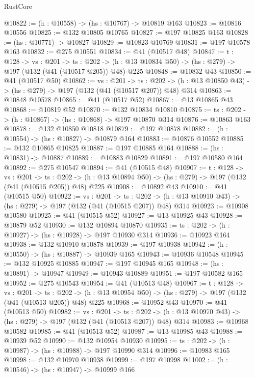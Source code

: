 \begin{lexlean}{RustCore}
\begin{coremodule}
@10822 := (h : @10558) -> (hs : @10767) -> @10819 @163
@10823 := @10816 @10556
@10825 := @132 @10805 @10765
@10827 := @197 @10825 @163
@10828 := (hs : @10771) -> @10827
@10829 := @10823 @10769
@10831 := @197 @10578 @163
@10832 := @275 @10551
@10834 := @41 (@10517 @48)
@10847 := {t : @128} ->
  {vs : @201} ->
  {ts : @202} -> (h : @13 @10834 @50) -> (hs : @279) -> @197 (@132 (@41 (@10517 @205)) @48) @225
@10848 := @10832 @43
@10850 := @41 (@10517 @50)
@10862 := {vs : @201} ->
  {ts : @202} -> (h : @13 @10850 @43) -> (hs : @279) -> @197 (@132 (@41 (@10517 @207)) @48) @314
@10863 := @10848 @10578
@10865 := @41 (@10517 @52)
@10867 := @13 @10865 @43
@10868 := @10819 @52
@10870 := @132 @10834 @10810
@10875 := {ts : @202} -> (h : @10867) -> (hs : @10868) -> @197 @10870 @314
@10876 := @10863 @163
@10878 := @132 @10850 @10818
@10879 := @197 @10878
@10882 := (h : @10554) -> (hs : @10827) -> @10879 @164
@10883 := @10876 @10552
@10885 := @132 @10865 @10825
@10887 := @197 @10885 @164
@10888 := (hs : @10831) -> @10887
@10889 := @10883 @10829
@10891 := @197 @10580 @164
@10892 := @275 @10547
@10894 := @41 (@10515 @48)
@10907 := {t : @128} ->
  {vs : @201} ->
  {ts : @202} -> (h : @13 @10894 @50) -> (hs : @279) -> @197 (@132 (@41 (@10515 @205)) @48) @225
@10908 := @10892 @43
@10910 := @41 (@10515 @50)
@10922 := {vs : @201} ->
  {ts : @202} -> (h : @13 @10910 @43) -> (hs : @279) -> @197 (@132 (@41 (@10515 @207)) @48) @314
@10923 := @10908 @10580
@10925 := @41 (@10515 @52)
@10927 := @13 @10925 @43
@10928 := @10879 @52
@10930 := @132 @10894 @10870
@10935 := {ts : @202} -> (h : @10927) -> (hs : @10928) -> @197 @10930 @314
@10936 := @10923 @164
@10938 := @132 @10910 @10878
@10939 := @197 @10938
@10942 := (h : @10550) -> (hs : @10887) -> @10939 @165
@10943 := @10936 @10548
@10945 := @132 @10925 @10885
@10947 := @197 @10945 @165
@10948 := (hs : @10891) -> @10947
@10949 := @10943 @10889
@10951 := @197 @10582 @165
@10952 := @275 @10543
@10954 := @41 (@10513 @48)
@10967 := {t : @128} ->
  {vs : @201} ->
  {ts : @202} -> (h : @13 @10954 @50) -> (hs : @279) -> @197 (@132 (@41 (@10513 @205)) @48) @225
@10968 := @10952 @43
@10970 := @41 (@10513 @50)
@10982 := {vs : @201} ->
  {ts : @202} -> (h : @13 @10970 @43) -> (hs : @279) -> @197 (@132 (@41 (@10513 @207)) @48) @314
@10983 := @10968 @10582
@10985 := @41 (@10513 @52)
@10987 := @13 @10985 @43
@10988 := @10939 @52
@10990 := @132 @10954 @10930
@10995 := {ts : @202} -> (h : @10987) -> (hs : @10988) -> @197 @10990 @314
@10996 := @10983 @165
@10998 := @132 @10970 @10938
@10999 := @197 @10998
@11002 := (h : @10546) -> (hs : @10947) -> @10999 @166

\end{coremodule}
\end{lexlean}
